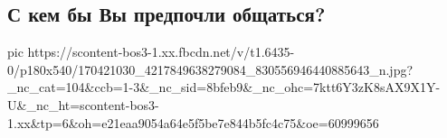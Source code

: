  
 
 
 
 

\subsection{С кем бы Вы предпочли общаться?}
\label{sec:08_04_2021.fb.arestovich_aleksei.2.psihologia_semja}

\ifcmt
  pic https://scontent-bos3-1.xx.fbcdn.net/v/t1.6435-0/p180x540/170421030_4217849638279084_830556946440885643_n.jpg?_nc_cat=104&ccb=1-3&_nc_sid=8bfeb9&_nc_ohc=7ktt6Y3zK8sAX9X1Y-U&_nc_ht=scontent-bos3-1.xx&tp=6&oh=e21eaa9054a64e5f5be7e844b5fc4c75&oe=60999656
\fi

